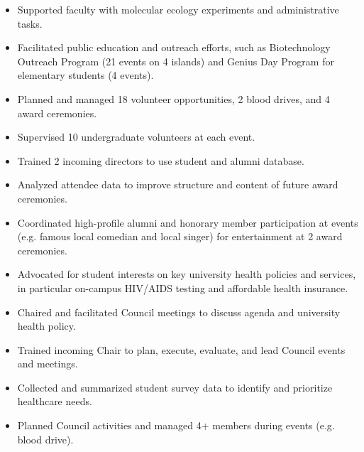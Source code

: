 \documentclass[a4paper, 12pt]{classycv}
\begin{document}
\begin{resume}

    \begin{itemize}
        \item Supported faculty with molecular ecology experiments and administrative tasks.
        \item Facilitated public education and outreach efforts, such as Biotechnology Outreach Program (21 events on 4 islands) and Genius Day Program for elementary students (4 events).
    \end{itemize}


    \begin{itemize}
        \item Planned and managed 18 volunteer opportunities, 2 blood drives, and 4 award ceremonies.
        \item Supervised 10 undergraduate volunteers at each event.
        \item Trained 2 incoming directors to use student and alumni database.
        \item Analyzed attendee data to improve structure and content of future award ceremonies.
        \item Coordinated high-profile alumni and honorary member participation at events (e.g. famous local comedian and local singer) for entertainment at 2 award ceremonies.
    \end{itemize}


    \begin{itemize}
        \item Advocated for student interests on key university health policies and services, in particular on-campus HIV/AIDS testing and affordable health insurance.
        \item Chaired and facilitated Council meetings to discuss agenda and university health policy.
        \item Trained incoming Chair to plan, execute, evaluate, and lead Council events and meetings.
        \item Collected and summarized student survey data to identify and prioritize healthcare needs.
        \item Planned Council activities and managed 4+ members during events (e.g. blood drive).
    \end{itemize}


\end{resume}
\end{document}
